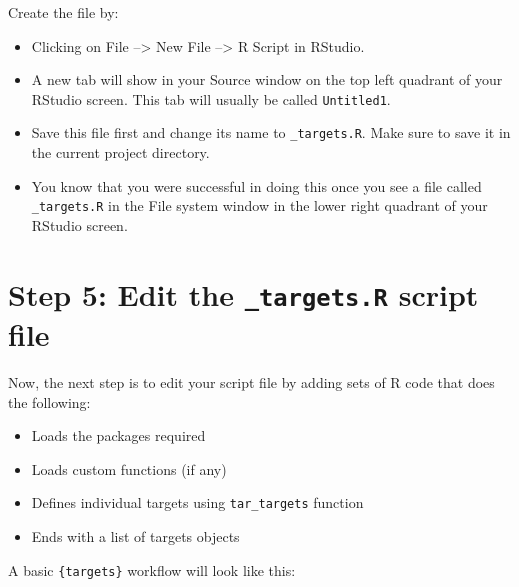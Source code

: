 \documentclass[
  12pt,
]{book}
\providecommand{\tightlist}{%
  \setlength{\itemsep}{0pt}\setlength{\parskip}{0pt}}
\begin{document}
Create the file by:

\begin{itemize}
\item
  Clicking on File --\textgreater{} New File --\textgreater{} R Script in RStudio.
\item
  A new tab will show in your Source window on the top left quadrant of your RStudio screen. This tab will usually be called \texttt{Untitled1}.
\item
  Save this file first and change its name to \texttt{\_targets.R}. Make sure to save it in the current project directory.
\item
  You know that you were successful in doing this once you see a file called \texttt{\_targets.R} in the File system window in the lower right quadrant of your RStudio screen.
\end{itemize}

\hypertarget{step-5-edit-the-_targets.r-script-file}{%
\section{\texorpdfstring{Step 5: Edit the \texttt{\_targets.R} script file}{Step 5: Edit the \_targets.R script file}}\label{step-5-edit-the-_targets.r-script-file}}

Now, the next step is to edit your script file by adding sets of R code that does the following:

\begin{itemize}
\tightlist
\item
  Loads the packages required
\item
  Loads custom functions (if any)
\item
  Defines individual targets using \texttt{tar\_targets} function
\item
  Ends with a list of targets objects
\end{itemize}

A basic \texttt{\{targets\}} workflow will look like this:
\end{document}
